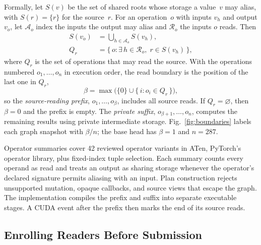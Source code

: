\documentclass[conference]{IEEEtran}
\begin{document}
Formally, let $S(v)$ be the set of shared roots whose storage a value~$v$ may alias, with $S(r)=\{r\}$ for the source~$r$. For an operation~$o$ with inputs $v_h$ and output $v_o$, let $\mathcal{A}_o$ index the inputs the output may alias and $\mathcal{R}_o$ the inputs $o$ reads. Then
\begin{equation}
\begin{aligned}
S(v_o)&=\textstyle\bigcup_{h\in \mathcal{A}_o} S(v_h),\\
Q_r&=\{\, o : \exists\, h\in \mathcal{R}_o,\; r\in S(v_h) \,\},
\end{aligned}\label{eq:reads}
\end{equation}
where $Q_r$ is the set of operations that may read the source. With the operations numbered $o_1,\dots,o_n$ in execution order, the read boundary is the position of the last one in $Q_r$,
\begin{equation}
\beta=\max\bigl(\{0\}\cup\{\, i : o_i\in Q_r \,\}\bigr), \label{eq:boundary}
\end{equation}
so the \emph{source-reading prefix}, $o_1,\dots,o_\beta$, includes all source reads. If $Q_r=\varnothing$, then $\beta=0$ and the prefix is empty. The \emph{private suffix}, $o_{\beta+1},\dots,o_n$, computes the remaining results using private intermediate storage. Fig.~\ref{fig:boundaries} labels each graph snapshot with $\beta/n$; the base head has $\beta=1$ and $n=287$.

Operator summaries cover 42 reviewed operator variants in ATen, PyTorch's operator library, plus fixed-index tuple selection. Each summary counts every operand as read and treats an output as sharing storage whenever the operator's declared signature permits aliasing with an input. Plan construction rejects unsupported mutation, opaque callbacks, and source views that escape the graph. The implementation compiles the prefix and suffix into separate executable stages. A CUDA event after the prefix then marks the end of its source reads.

\subsection{Enrolling Readers Before Submission}
\label{sec:enroll}
\end{document}
